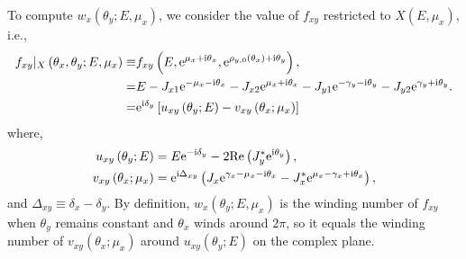 \documentclass[pdflatex,sn-nature, iicol]{sn-jnl}%
\theoremstyle{thmstyleone}%
\theoremstyle{thmstyletwo}%
\theoremstyle{thmstylethree}%
\begin{document}
To compute $w_{x}(\theta_{y};E,\mu_{x})$, we consider the value of
$f_{xy}$ restricted to $X(E,\mu_{x})$, i.e., 
\begin{align}
f_{xy}|_{X}\left(\theta_{x},\theta_{y};E,\mu_{x}\right)\equiv & f_{xy}\left(E,\mathrm{e}^{\mu_{x}+\mathrm{i}\theta_{x}},\mathrm{e}^{\rho_{y,0}(\theta_{x})+\mathrm{i}\theta_{y}}\right),\nonumber \\
= & E-J_{x1}\mathrm{e}^{-\mu_{x}-\mathrm{i}\theta_{x}}-J_{x2}\mathrm{e}^{\mu_{x}+\mathrm{i}\theta_{x}}-J_{y1}\mathrm{e}^{-\gamma_{y}-\mathrm{i}\theta_{y}}-J_{y2}\mathrm{e}^{\gamma_{y}+\mathrm{i}\theta_{y}}.\nonumber \\
= & \mathrm{e}^{\mathrm{i}\delta_{y}}\left[u_{xy}\left(\theta_{y};E\right)-v_{xy}\left(\theta_{x};\mu_{x}\right)\right]
\end{align}
where, 
\begin{align}
u_{xy}\left(\theta_{y};E\right) & =E\mathrm{e}^{-\mathrm{i}\delta_{y}}-2\text{Re}\left(J_{y}^{*}\mathrm{e}^{\mathrm{i}\theta_{y}}\right),\label{eq:uxy}\\
v_{xy}\left(\theta_{x};\mu_{x}\right) & =\mathrm{e}^{\mathrm{i}\Delta_{xy}}\left(J_{x}\mathrm{e}^{\gamma_{x}-\mu_{x}-\mathrm{i}\theta_{x}}-J_{x}^{*}\mathrm{e}^{\mu_{x}-\gamma_{x}+\mathrm{i}\theta_{x}}\right),\label{eq:vxy}
\end{align}
and $\Delta_{xy}\equiv\delta_{x}-\delta_{y}$. By definition, $w_{x}(\theta_{y};E,\mu_{x})$
is the winding number of $f_{xy}$ when $\theta_{y}$ remains constant
and $\theta_{x}$ winds around $2\pi$, so it equals the winding number
of $v_{xy}(\theta_{x};\mu_{x})$ around $u_{xy}(\theta_{y};E)$ on
the complex plane.
\end{document}
